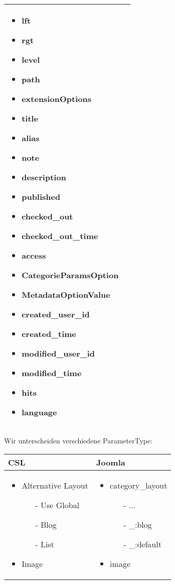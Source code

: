 \begin{minipage}{0.7\textwidth}
\begin{tabular}{|p{} | p{}|}
\begin{itemize}
\item lft
\item rgt
\item level
\item path
\item  extensionOptions
\item  title
\item  alias
\item  note
\item  description
\item  published
\item  checked\_out
\item  checked\_out\_time
\item  access
\item  CategorieParamsOption
\item  MetadataOptionValue
\item  created\_user\_id
\item  created\_time
\item  modified\_user\_id
\item  modified\_time
\item  hits
\item  language
\end{itemize}
\\
\hline
\end{tabular}
\end{minipage}

Wir unterscheiden verschiedene ParameterType:

\begin{minipage}{0.5\textwidth}
\begin{tabular}{|p{} | p{}|}
\hline
\textbf{CSL} & \textbf{Joomla} \\ 
\hline
\begin{itemize}
\item Alternative Layout
    \begin{enumerate}
		\item[-] Use Global
		\item[-] Blog 
		\item[-] List
	\end{enumerate}
\item Image
\end{itemize}
 & 
\begin{itemize}
\item category\_layout
    \begin{enumerate}
		\item[-] ...
		\item[-] \_:blog
		\item[-] \_:default
	\end{enumerate}
\item image
\end{itemize}
\\
\hline
\end{tabular}
\end{minipage}

